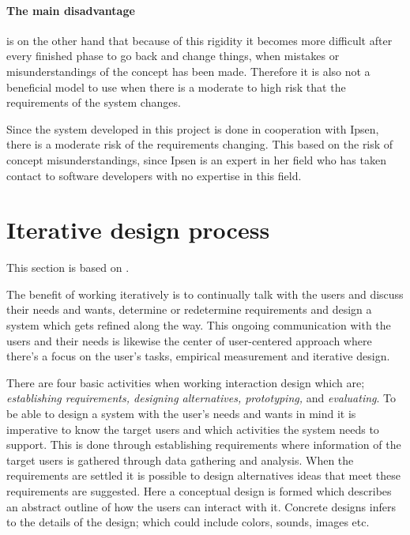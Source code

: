 \paragraph{The main disadvantage} is on the other hand that because of this rigidity it becomes more difficult after every finished phase to go back and change things, when mistakes or misunderstandings of the concept has been made.
Therefore it is also not a beneficial model to use when there is a moderate to high risk that the requirements of the system changes.

Since the system developed in this project is done in cooperation with Ipsen, there is a moderate risk of the requirements changing.
This based on the risk of concept misunderstandings, since Ipsen is an expert in her field who has taken contact to software developers with no expertise in this field.

\section{Iterative design process} \label{sec:iterativ}
This section is based on \cite{InteractionDesign,Rod-Aalborg,Iterative-Toolsqa}.


The benefit of working iteratively is to continually talk with the users and discuss their needs and wants, determine or redetermine requirements and design a system which gets refined along the way. This ongoing communication with the users and their needs is likewise the center of user-centered approach where there’s a focus on the user’s tasks, empirical measurement and iterative design.

There are four basic activities when working interaction design which are;
\textit{establishing requirements, designing alternatives, prototyping,} and \textit{evaluating}. To be able to design a system with the user’s needs and wants in mind it is imperative to know the target users and which activities the system needs to support. This is done through establishing requirements where information of the target users is gathered through data gathering and analysis. When the requirements are settled it is possible to design alternatives ideas that meet these requirements are suggested. Here a conceptual design is formed which describes an abstract outline of how the users can interact with it. Concrete designs infers to the details of the design; which could include colors, sounds, images etc. 

